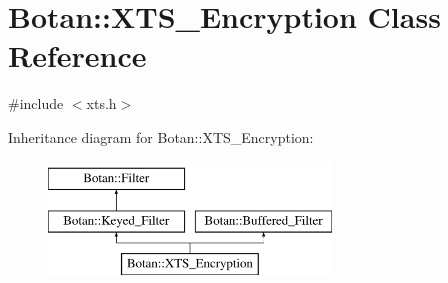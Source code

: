 \hypertarget{classBotan_1_1XTS__Encryption}{\section{Botan\-:\-:X\-T\-S\-\_\-\-Encryption Class Reference}
\label{classBotan_1_1XTS__Encryption}
}


{\ttfamily \#include $<$xts.\-h$>$}

Inheritance diagram for Botan\-:\-:X\-T\-S\-\_\-\-Encryption\-:\begin{figure}[H]
\begin{center}
\leavevmode
\includegraphics[height=3.000000cm]{classBotan_1_1XTS__Encryption}
\end{center}
\end{figure}

